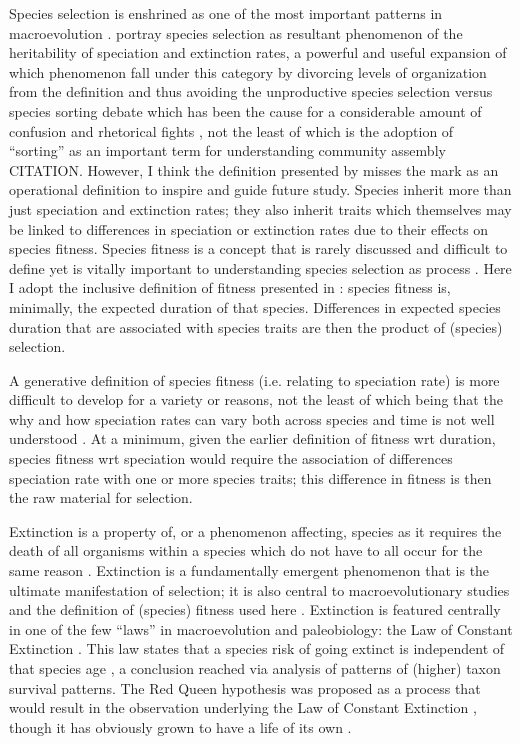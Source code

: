 Species selection is enshrined as one of the most important patterns in macroevolution \citep{Stanley1975,Stanley1979,Vrba1986,Jablonski2008a,Rabosky2010b,Simpson2016a,Pennell2014}. \citet{Rabosky2010b} portray species selection as resultant phenomenon of the heritability of speciation and extinction rates, a powerful and useful expansion of which phenomenon fall under this category by divorcing levels of organization from the definition and thus avoiding the unproductive species selection versus species sorting debate which has been the cause for a considerable amount of confusion and rhetorical fights \citep{Vrba1984a,Vrba1986,Lloyd1993,Pennell2014}, not the least of which is the adoption of ``sorting'' as an important term for understanding community assembly CITATION. However, I think the definition presented by \citet{Rabosky2010b} misses the mark as an operational definition to inspire and guide future study. Species inherit more than just speciation and extinction rates; they also inherit traits which themselves may be linked to differences in speciation or extinction rates due to their effects on species fitness. Species fitness is a concept that is rarely discussed and difficult to define yet is vitally important to understanding species selection as process \citep{Cooper1984,Palmer2012}. Here I adopt the inclusive definition of fitness presented in \citet{Cooper1984}: species fitness is, minimally, the expected duration of that species. Differences in expected species duration that are associated with species traits are then the product of (species) selection.

A generative definition of species fitness (i.e. relating to speciation rate) is more difficult to develop for a variety or reasons, not the least of which being that the why and how speciation rates can vary both across species and time is not well understood \citep{Rabosky2015c,Rabosky2013e,Coyne2004}. At a minimum, given the earlier definition of fitness wrt duration, species fitness wrt speciation would require the association of differences speciation rate with one or more species traits; this difference in fitness is then the raw material for selection. 

Extinction is a property of, or a phenomenon affecting, species as it requires the death of all organisms within a species which do not have to all occur for the same reason \citep{Simpson2016a}. Extinction is a fundamentally emergent phenomenon that is the ultimate manifestation of selection; it is also central to macroevolutionary studies and the definition of (species) fitness used here \citep{Cooper1984}. Extinction is featured centrally in one of the few ``laws'' in macroevolution and paleobiology: the Law of Constant Extinction \citep{VanValen1973,Liow2011a}. This law states that a species risk of going extinct is independent of that species age \citep{VanValen1973,Liow2011a}, a conclusion reached via analysis of patterns of (higher) taxon survival patterns. The Red Queen hypothesis was proposed as a process that would result in the observation underlying the Law of Constant Extinction \citep{VanValen1973}, though it has obviously grown to have a life of its own \citep{Liow2011a}.

